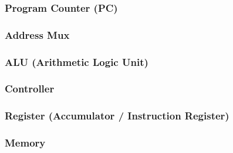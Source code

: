 \subsubsection{Program Counter (PC)}


\subsubsection{Address Mux}


\subsubsection{ALU (Arithmetic Logic Unit)}


\subsubsection{Controller}


\subsubsection{Register (Accumulator / Instruction Register)}


\subsubsection{Memory}

